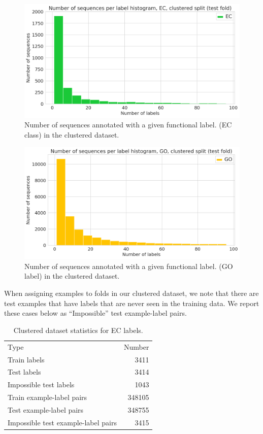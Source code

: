 \pagebreak
\begin{figure}[htbp]
\centering
  \includegraphics[width=\textwidth]{Figures/sequences_per_label_ec_clustered.png}
  \caption{Number of sequences annotated with a given functional label. (EC class) in the clustered dataset.}
\end{figure}
\begin{figure}[htbp]
\centering
  \includegraphics[width=\textwidth]{Figures/sequences_per_label_go_clustered.png}
  \caption{Number of sequences annotated with a given functional label. (GO label) in the clustered dataset.}
\end{figure}
\pagebreak
When assigning examples to folds in our clustered dataset, we note that there are test examples that have labels that are never seen in the training data. We report these cases below as ``Impossible'' test example-label pairs.
\begin{table}[htbp]
\centering
\begin{tabular}{|l|r|}
\hline
                                Type &  Number \\
\Xhline{2pt}
                        Train labels &    3411 \\
\hline
                         Test labels &    3414 \\
\hline
              Impossible test labels &    1043 \\
\hline
           Train example-label pairs &  348105 \\
\hline
            Test example-label pairs &  348755 \\
\hline
 Impossible test example-label pairs &    3415 \\
\hline
\end{tabular}
\caption{Clustered dataset statistics for EC labels.}
\end{table}
